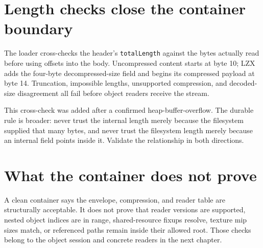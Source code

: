 \section{Length checks close the container boundary}

The loader cross-checks the header's \texttt{totalLength} against the bytes actually read before
using offsets into the body.  Uncompressed content starts at byte 10; LZX adds the four-byte
decompressed-size field and begins its compressed payload at byte 14.  Truncation, impossible
lengths, unsupported compression, and decoded-size disagreement all fail before object readers
receive the stream.

This cross-check was added after a confirmed heap-buffer-overflow.  The durable rule is broader:
never trust the internal length merely because the filesystem supplied that many bytes, and
never trust the filesystem length merely because an internal field points inside it.  Validate
the relationship in both directions.

\section{What the container does not prove}

A clean container says the envelope, compression, and reader table are structurally acceptable.
It does not prove that reader versions are supported, nested object indices are in range,
shared-resource fixups resolve, texture mip sizes match, or referenced paths remain inside their
allowed root.  Those checks belong to the object session and concrete readers in the next
chapter.
